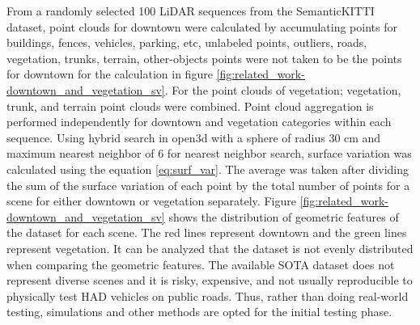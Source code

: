 From a randomly selected 100 LiDAR sequences from the SemanticKITTI dataset, point clouds for downtown were calculated by accumulating points for buildings, fences, vehicles, parking, etc, unlabeled points, outliers, roads, vegetation, trunks, terrain, other-objects points were not taken to be the points for downtown for the calculation in figure \ref{fig:related_work-downtown_and_vegetation_sv}. For the point clouds of vegetation; vegetation, trunk, and terrain point clouds were combined. Point cloud aggregation is performed independently for downtown and vegetation categories within each sequence. Using hybrid search in open3d \parencite{open3d} with a sphere of radius 30 cm and maximum nearest neighbor of 6 for nearest neighbor search, surface variation was calculated using the equation \ref{eq:surf_var}. The average was taken after dividing the sum of the surface variation of each point by the total number of points for a scene for either downtown or vegetation separately. Figure \ref{fig:related_work-downtown_and_vegetation_sv} shows the distribution of geometric features of the dataset for each scene. The red lines represent downtown and the green lines represent vegetation. It can be analyzed that the dataset is not evenly distributed when comparing the geometric features. The available SOTA dataset does not represent diverse scenes and it is risky, expensive, and not usually reproducible to physically test HAD vehicles on public roads. Thus, rather than doing real-world testing, simulations and other methods are opted for the initial testing phase.




